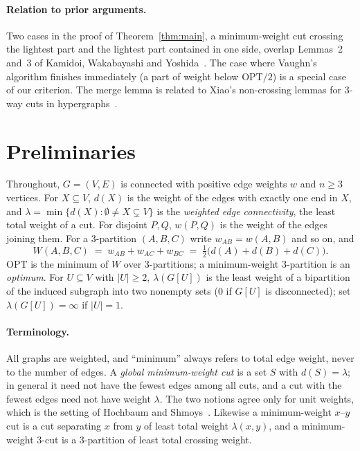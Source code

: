\documentclass[preprint,12pt]{elsarticle}
\theoremstyle{definition}
\newcommand{\OPT}{\mathrm{OPT}}
\begin{document}
\paragraph{Relation to prior arguments.}
Two cases in the proof of Theorem~\ref{thm:main}, a minimum-weight cut crossing the lightest part and
the lightest part contained in one side, overlap Lemmas~2 and~3 of Kamidoi, Wakabayashi and
Yoshida~\cite{KamidoiWY2002}. The case where Vaughn's algorithm finishes immediately (a part of weight
below $\OPT/2$) is a special case of our criterion. The merge lemma is related to Xiao's non-crossing
lemmas for 3-way cuts in hypergraphs~\cite{Xiao2008}.

\section{Preliminaries}\label{sec:prelim}

Throughout, $G=(V,E)$ is connected with positive edge weights $w$ and $n\ge 3$ vertices. For
$X\subseteq V$, $d(X)$ is the weight of the edges with exactly one end in $X$, and
$\lambda=\min\{d(X):\emptyset\ne X\subsetneq V\}$ is the \emph{weighted edge connectivity}, the least
total weight of a cut. For disjoint $P,Q$, $w(P,Q)$ is the weight of the edges joining them. For a
3-partition $(A,B,C)$ write $w_{AB}=w(A,B)$ and so on, and
\[
  W(A,B,C) \;=\; w_{AB}+w_{AC}+w_{BC} \;=\; \tfrac12\bigl(d(A)+d(B)+d(C)\bigr).
\]
$\OPT$ is the minimum of $W$ over 3-partitions; a minimum-weight 3-partition is an \emph{optimum}. For
$U\subseteq V$ with $|U|\ge2$, $\lambda(G[U])$ is the least weight of a bipartition of the induced
subgraph into two nonempty sets ($0$ if $G[U]$ is disconnected); set $\lambda(G[U])=\infty$ if $|U|=1$.

\paragraph{Terminology.} All graphs are weighted, and ``minimum'' always refers to total edge weight,
never to the number of edges. A \emph{global minimum-weight cut} is a set $S$ with $d(S)=\lambda$; in
general it need not have the fewest edges among all cuts, and a cut with the fewest edges need not
have weight $\lambda$. The two notions agree only for unit weights, which is the setting of
Hochbaum and Shmoys~\cite{HochbaumShmoys1985}. Likewise a minimum-weight $x$--$y$ cut is a cut
separating $x$ from $y$ of least total weight $\lambda(x,y)$, and a minimum-weight 3-cut is a
3-partition of least total crossing weight.
\end{document}
